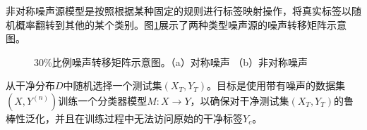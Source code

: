 非对称噪声源模型是按照根据某种固定的规则进行标签映射操作，将真实标签以随机概率翻转到其他的某个类别。图\ref{fig:noisy_type}展示了两种类型噪声源的噪声转移矩阵示意图。
\begin{figure}[ht!]
    \caption{30\%比例噪声转移矩阵示意图。（a）对称噪声 （b）非对称噪声}
    \label{fig:noisy_type}
\end{figure}

从干净分布$D$中随机选择一个测试集$(X_T, Y_T)$。目标是使用带有噪声的数据集$(X, Y^{(n)})$训练一个分类器模型$M:X \rightarrow Y$，以确保对干净测试集$(X_T, Y_T)$的鲁棒性泛化，并且在训练过程中无法访问原始的干净标签$Y_c$。



